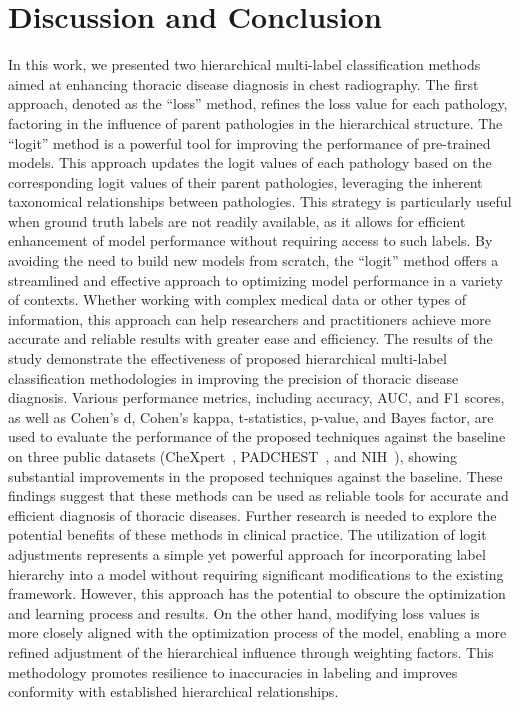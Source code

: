 \section{Discussion and Conclusion}\label{sec:taxonomy.discussion}
In this work, we presented two hierarchical multi-label classification methods aimed at enhancing thoracic disease diagnosis in chest radiography. The first approach, denoted as the ``loss'' method, refines the loss value for each pathology, factoring in the influence of parent pathologies in the hierarchical structure.  The ``logit'' method is a powerful tool for improving the performance of pre-trained models. This approach updates the logit values of each pathology based on the corresponding logit values of their parent pathologies, leveraging the inherent taxonomical relationships between pathologies. This strategy is particularly useful when ground truth labels are not readily available, as it allows for efficient enhancement of model performance without requiring access to such labels. By avoiding the need to build new models from scratch, the ``logit'' method offers a streamlined and effective approach to optimizing model performance in a variety of contexts. Whether working with complex medical data or other types of information, this approach can help researchers and practitioners achieve more accurate and reliable results with greater ease and efficiency.
The results of the study demonstrate the effectiveness of proposed hierarchical multi-label classification methodologies in improving the precision of thoracic disease diagnosis. Various performance metrics, including accuracy, AUC, and F1 scores, as well as Cohen's d, Cohen's kappa, t-statistics, p-value, and Bayes factor, are used to evaluate the performance of the proposed techniques against the baseline on three public datasets (CheXpert~\cite{irvin_CheXpert_2019}, PADCHEST~\cite{bustos_Padchest_2020}, and NIH~\cite{wang_ChestXRay8_2017}), showing substantial improvements in the proposed techniques against the baseline. These findings suggest that these methods can be used as reliable tools for accurate and efficient diagnosis of thoracic diseases. Further research is needed to explore the potential benefits of these methods in clinical practice.
The utilization of logit adjustments represents a simple yet powerful approach for incorporating label hierarchy into a model without requiring significant modifications to the existing framework. However, this approach has the potential to obscure the optimization and learning process and results. On the other hand, modifying loss values is more closely aligned with the optimization process of the model, enabling a more refined adjustment of the hierarchical influence through weighting factors. This methodology promotes resilience to inaccuracies in labeling and improves conformity with established hierarchical relationships.
